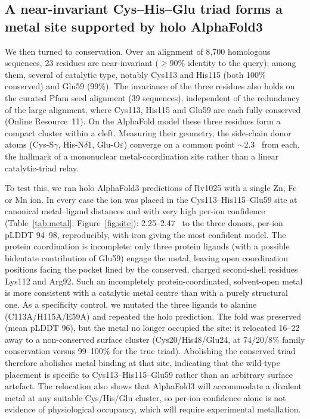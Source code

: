 \documentclass[11pt,a4paper]{article}
\newcommand{\ang}{\text{\AA}}
\begin{document}
\subsection{A near-invariant Cys--His--Glu triad forms a metal site supported by holo AlphaFold3}

We then turned to conservation. Over an alignment of 8{,}700 homologous sequences, 23 residues are near-invariant ($\geq 90\%$ identity to the query); among them, several of catalytic type, notably Cys113 and His115 (both 100\% conserved) and Glu59 (99\%). The invariance of the three residues also holds on the curated Pfam seed alignment (39 sequences), independent of the redundancy of the large alignment, where Cys113, His115 and Glu59 are each fully conserved (Online Resource~11). On the AlphaFold model these three residues form a compact cluster within a cleft. Measuring their geometry, the side-chain donor atoms (Cys-S$\gamma$, His-N$\delta$1, Glu-O$\varepsilon$) converge on a common point $\sim$2.3~\ang{} from each, the hallmark of a mononuclear metal-coordination site rather than a linear catalytic-triad relay.

To test this, we ran holo AlphaFold3 predictions of Rv1025 with a single Zn, Fe or Mn ion. In every case the ion was placed in the Cys113--His115--Glu59 site at canonical metal--ligand distances and with very high per-ion confidence (Table~\ref{tab:metal}; Figure~\ref{fig:site}): 2.25--2.47~\ang{} to the three donors, per-ion pLDDT 94--98, reproducibly, with iron giving the most confident model. The protein coordination is incomplete: only three protein ligands (with a possible bidentate contribution of Glu59) engage the metal, leaving open coordination positions facing the pocket lined by the conserved, charged second-shell residues Lys112 and Arg92. Such an incompletely protein-coordinated, solvent-open metal is more consistent with a catalytic metal centre than with a purely structural one. As a specificity control, we mutated the three ligands to alanine (C113A/H115A/E59A) and repeated the holo prediction. The fold was preserved (mean pLDDT 96), but the metal no longer occupied the site: it relocated 16--22~\ang{} away to a non-conserved surface cluster (Cys20/His48/Glu24, at 74/20/8\% family conservation versus 99--100\% for the true triad). Abolishing the conserved triad therefore abolishes metal binding at that site, indicating that the wild-type placement is specific to Cys113--His115--Glu59 rather than an arbitrary surface artefact. The relocation also shows that AlphaFold3 will accommodate a divalent metal at any suitable Cys/His/Glu cluster, so per-ion confidence alone is not evidence of physiological occupancy, which will require experimental metallation.
\end{document}
